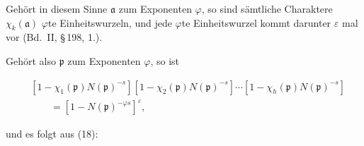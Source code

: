 Gehört in diesem Sinne $\mathfrak{a}$ zum Exponenten $\varphi$, so sind sämtliche Charaktere $\chi_k(\mathfrak{a})$ $\varphi$te Einheitswurzeln, und jede $\varphi$te Einheitswurzel kommt darunter $\varepsilon$ mal vor (Bd.\ II, \S\,198, 1.).

Gehört also $\mathfrak{p}$ zum Exponenten $\varphi$, so ist

\[
\begin{aligned}
&[1 - \chi_1(\mathfrak{p})N(\mathfrak{p})^{-s}][1 - \chi_2(\mathfrak{p})N(\mathfrak{p})^{-s}]\cdots[1 - \chi_h(\mathfrak{p})N(\mathfrak{p})^{-s}] \\
&\qquad = [1 - N(\mathfrak{p})^{-\varphi s}]^\varepsilon,
\end{aligned}
\]

und es folgt aus (18):


